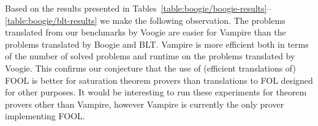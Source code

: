 Based on the results presented in Tables~\ref{table:boogie/boogie-results}--\ref{table:boogie/blt-results} we make the following observation. The problems translated from our benchmarks by Voogie are easier for Vampire than the problems translated by Boogie and BLT. Vampire is more efficient both in terms of the number of solved problems and runtime on the problems translated by Voogie. 
This confirms our conjecture that the use of (efficient translations of) FOOL is better for saturation theorem provers than translations to FOL designed for other purposes. It would be interesting to run these experiments for theorem provers other than Vampire, however Vampire is currently the only prover implementing FOOL.






